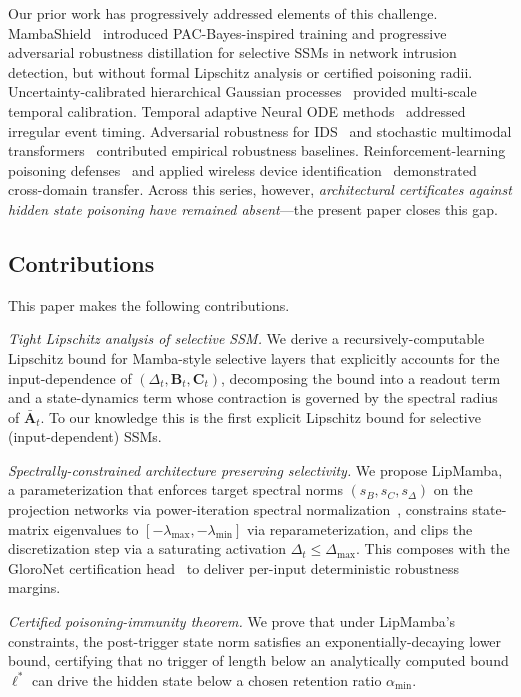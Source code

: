 \documentclass[journal,a4paper,10pt]{IEEEtran}
\theoremstyle{definition}
\theoremstyle{remark}
\newcommand{\modelname}{LipMamba}
\begin{document}
Our prior work has progressively addressed elements of this challenge. MambaShield~\cite{anaedevha2025mambashield} introduced PAC-Bayes-inspired training and progressive adversarial robustness distillation for selective SSMs in network intrusion detection, but without formal Lipschitz analysis or certified poisoning radii. Uncertainty-calibrated hierarchical Gaussian processes~\cite{anaedevha2026uchgp} provided multi-scale temporal calibration. Temporal adaptive Neural ODE methods~\cite{anaedevha2026tanode} addressed irregular event timing. Adversarial robustness for IDS~\cite{anaedevha2024adversarial} and stochastic multimodal transformers~\cite{anaedevha2025stochastic} contributed empirical robustness baselines. Reinforcement-learning poisoning defenses~\cite{anaedevha2025dqn} and applied wireless device identification~\cite{anaedevha2024wireless} demonstrated cross-domain transfer. Across this series, however, \emph{architectural certificates against hidden state poisoning have remained absent}---the present paper closes this gap.

\subsection{Contributions}

This paper makes the following contributions.

\textit{Tight Lipschitz analysis of selective SSM.} We derive a recursively-computable Lipschitz bound for Mamba-style selective layers that explicitly accounts for the input-dependence of $(\Delta_t, \mathbf{B}_t, \mathbf{C}_t)$, decomposing the bound into a readout term and a state-dynamics term whose contraction is governed by the spectral radius of $\bar{\mathbf{A}}_t$. To our knowledge this is the first explicit Lipschitz bound for selective (input-dependent) SSMs.

\textit{Spectrally-constrained architecture preserving selectivity.} We propose \modelname{}, a parameterization that enforces target spectral norms $(s_B, s_C, s_\Delta)$ on the projection networks via power-iteration spectral normalization~\cite{miyato2018spectral}, constrains state-matrix eigenvalues to $[-\lambda_{\max}, -\lambda_{\min}]$ via reparameterization, and clips the discretization step via a saturating activation $\Delta_t \leq \Delta_{\max}$. This composes with the GloroNet certification head~\cite{leino2021globally} to deliver per-input deterministic robustness margins.

\textit{Certified poisoning-immunity theorem.} We prove that under \modelname{}'s constraints, the post-trigger state norm satisfies an exponentially-decaying lower bound, certifying that no trigger of length below an analytically computed bound $\ell^*$ can drive the hidden state below a chosen retention ratio $\alpha_{\min}$.
\end{document}

